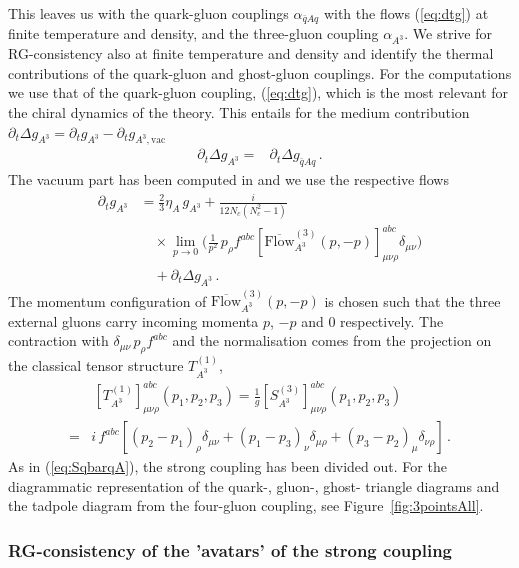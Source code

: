 \documentclass[%
reprint,
superscriptaddress,
showpacs,preprintnumbers,
 amsmath,amssymb,
 aps,
prd,
]{revtex4-1}
\def\Fig#1{Figure~\ref{#1}}
\def\eq#1{(\ref{#1})}
\begin{document}
This leaves us with the quark-gluon couplings $\alpha_{\bar q Aq}$
with the flows \eq{eq:dtg} at finite temperature and density, and the
three-gluon coupling $\alpha_{A^3}$. We strive for RG-consistency also
at finite temperature and density and identify the thermal
contributions of the quark-gluon and ghost-gluon couplings. For the
computations we use that of the quark-gluon coupling, \eq{eq:dtg},
which is the most relevant for the chiral dynamics of the theory. This
entails for the medium contribution
$\partial_t \Delta g_{A^3}= \partial_t g_{A^3}-\partial_t
g_{A^3,\textrm{vac}}$
%
\begin{align}
  \partial_t \Delta g_{A^3}=
  &
    \partial_t \Delta g_{\bar{q}Aq} \,.
 \label{eq:dtDeltagA3}
\end{align}
%
The vacuum part has been computed in \cite{Braun:2014ata} and we use
the respective flows
%
\begin{align}\label{eq:dtgA3}
  \nonumber
  \partial_t g_{A^3}
  &=\frac{2}{3} \eta_A\, g_{A^3} +
    \frac{i}{12 N_c (N_c^2-1)}\\[1ex]\nonumber
  &\quad \times \lim_{p\rightarrow 0}
    \bigg(\frac{1}{p^2}\,p_\rho f^{abc} \left[
    \overline{{\textrm{Flow}}}^{(3)}_{A^3} (p,-p)\right]^{abc}_{\mu\nu\rho}
    \delta_{\mu\nu}\bigg)\\[1ex]
  &\quad +\partial_t \Delta g_{A^3}\,. 
\end{align}
%
The momentum configuration of
$ \overline{{\textrm{Flow}}}^{(3)}_{A^3}(p,-p)$ is chosen such that
the three external gluons carry incoming momenta $p$, $-p$ and 0
respectively. The contraction with $\delta_{\mu\nu}\,p_\rho f^{abc} $
and the normalisation comes from the projection on the classical
tensor structure $T^{{(1)}}_{A^3}$,
%
\begin{align}\nonumber 
  &\,  \left[T^{{(1)}}_{A^3}\right]^{abc}_{\mu\nu\rho}(p_1,p_2,p_3)
    = \frac{1}{g} \left[S^{(3)}_{A^3}
    \right]^{abc}_{\mu\nu\rho}(p_1,p_2,p_3)\\[1ex] 
  = &   i\, f^{abc} \left[ (p_2 -p_1)_\rho \delta_{\mu\nu}+ (p_1 -p_3)_\nu
      \delta_{\mu\rho}+ (p_3 -p_2)_\mu \delta_{\nu\rho}\right]\,. 
    \label{eq:SA3}
\end{align}
%
As in \eq{eq:SqbarqA}, the strong coupling has been divided out.  For
the diagrammatic representation of the quark-, gluon-, ghost- triangle
diagrams and the tadpole diagram from the four-gluon coupling, see
\Fig{fig:3pointsAll}.



\subsubsection{RG-consistency of the 'avatars' of the strong
  coupling}\label{sec:RGconsistency}
\end{document}
